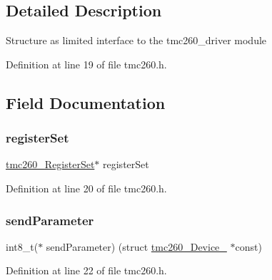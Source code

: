 \subsection{Detailed Description}
Structure as limited interface to the tmc260\+\_\+driver module 

Definition at line 19 of file tmc260.\+h.



\subsection{Field Documentation}
\mbox{\label{structtmc260___device___a4eda80dc5e75cfc6f0e31dbf1813f418}} 
\subsubsection{\texorpdfstring{register\+Set}{registerSet}}
{\footnotesize\ttfamily \mbox{\hyperlink{tmc260_8h_a71348958a41c5e0cfdf99d907eb2ab3c}{tmc260\+\_\+\+Register\+Set}}$\ast$ register\+Set}



Definition at line 20 of file tmc260.\+h.

\mbox{\label{structtmc260___device___ac7d5bdab96761c76f99aa33aa1beb2bf}} 
\subsubsection{\texorpdfstring{send\+Parameter}{sendParameter}}
{\footnotesize\ttfamily int8\+\_\+t($\ast$  send\+Parameter) (struct \mbox{\hyperlink{structtmc260___device__}{tmc260\+\_\+\+Device\+\_\+}} $\ast$const)}



Definition at line 22 of file tmc260.\+h.

\mbox{\label{structtmc260___device___a715a7a311876d9340872cb1d16652aeb}} 
